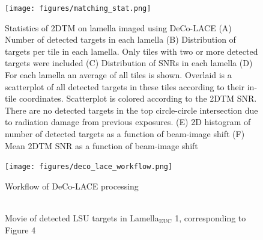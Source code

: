 \documentclass[
]{article}
\newenvironment{fignos:tagged-figure}[1][]{
    \let\oldthefigure\thefigure
    \let\oldtheHfigure\theHfigure
    \renewcommand{\thefigure}{#1}
    \renewcommand{\theHfigure}{#1}
  }{
    \let\thefigure\oldthefigure
    \let\theHfigure\oldtheHfigure
    \addtocounter{figure}{-1}
  }
\providecommand{\DIFaddbegin}{} %
\providecommand{\DIFaddend}{} %
\providecommand{\DIFdelbegin}{} %
\providecommand{\DIFdelend}{} %
\providecommand{\DIFaddbeginFL}{} %
\providecommand{\DIFaddendFL}{} %
\providecommand{\DIFdelbeginFL}{} %
\providecommand{\DIFdelendFL}{} %
\newcommand{\DIFscaledelfig}{0.5}
\newlength{\DIFdelgraphicswidth} %
\newlength{\DIFdelgraphicsheight} %
\newcommand{\DIFaddincludegraphics}[2][]{{\color{blue}\fbox{\DIFOincludegraphics[#1]{#2}}}} %
\newcommand{\DIFdelincludegraphics}[2][]{%
\sbox{\DIFdelgraphicsbox}{\DIFOincludegraphics[#1]{#2}}%
\settoboxwidth{\DIFdelgraphicswidth}{\DIFdelgraphicsbox} %
\settoboxtotalheight{\DIFdelgraphicsheight}{\DIFdelgraphicsbox} %
\scalebox{\DIFscaledelfig}{%
\parbox[b]{\DIFdelgraphicswidth}{\usebox{\DIFdelgraphicsbox}\\[-\baselineskip] \rule{\DIFdelgraphicswidth}{0em}}\llap{\resizebox{\DIFdelgraphicswidth}{\DIFdelgraphicsheight}{%
\setlength{\unitlength}{\DIFdelgraphicswidth}%
\begin{picture}(1,1)%
\thicklines\linethickness{2pt} %
{\color[rgb]{1,0,0}\put(0,0){\framebox(1,1){}}}%
{\color[rgb]{1,0,0}\put(0,0){\line( 1,1){1}}}%
{\color[rgb]{1,0,0}\put(0,1){\line(1,-1){1}}}%
\end{picture}%
}\hspace*{3pt}}} %
} %
\DeclareRobustCommand{\DIFaddbegin}{\DIFOaddbegin \let\includegraphics\DIFaddincludegraphics} %
\DeclareRobustCommand{\DIFaddend}{\DIFOaddend \let\includegraphics\DIFOincludegraphics} %
\DeclareRobustCommand{\DIFdelbegin}{\DIFOdelbegin \let\includegraphics\DIFdelincludegraphics} %
\DeclareRobustCommand{\DIFdelend}{\DIFOaddend \let\includegraphics\DIFOincludegraphics} %
\DeclareRobustCommand{\DIFaddbeginFL}{\DIFOaddbeginFL \let\includegraphics\DIFaddincludegraphics} %
\DeclareRobustCommand{\DIFaddendFL}{\DIFOaddendFL \let\includegraphics\DIFOincludegraphics} %
\DeclareRobustCommand{\DIFdelbeginFL}{\DIFOdelbeginFL \let\includegraphics\DIFdelincludegraphics} %
\DeclareRobustCommand{\DIFdelendFL}{\DIFOaddendFL \let\includegraphics\DIFOincludegraphics} %
\begin{document}
\begin{figure}
\hypertarget{fig:matching_stat}{%
\centering
\texttt{[image: figures/matching\_stat.png]}
\caption{Statistics of 2DTM on lamella imaged using DeCo-LACE (A) Number of
detected targets in each lamella (B) Distribution of targets per tile in
each lamella. Only tiles with two or more detected targets were included
(C) Distribution of SNRs in each lamella (D) For each lamella an average
of all tiles is shown. Overlaid is a scatterplot of all detected targets
in these tiles according to their in-tile coordinates. Scatterplot is
colored according to the 2DTM SNR. There are no detected targets in the
top circle-circle intersection due to radiation damage from previous
exposures. (E) 2D histogram of number of detected targets as a function
of beam-image shift (F) Mean 2DTM SNR as a function of beam-image
shift}\label{fig:matching_stat}
}
\end{figure}

\begin{figure}
\hypertarget{fig:deco_lace_workflow}{%
\centering
\texttt{[image: figures/deco\_lace\_workflow.png]}
\caption{Workflow of DeCo-LACE
processing}\label{fig:deco_lace_workflow}
}
\end{figure}

\DIFdelbegin %
\DIFdelend \DIFaddbegin \begin{fignos:tagged-figure}
\DIFaddend 

\begin{figure}
\DIFdelbeginFL %
\DIFdelendFL \DIFaddbeginFL \hypertarget{fig:movie1}{%
\centering
\includegraphics{images/1x1-00000000.png}
\caption{Movie of detected LSU targets in Lamella\(_\textrm{EUC}\) 1,
corresponding to Figure 4}\label{fig:movie1}
}
\DIFaddendFL \end{figure}

\end{fignos:tagged-figure}
\end{document}
